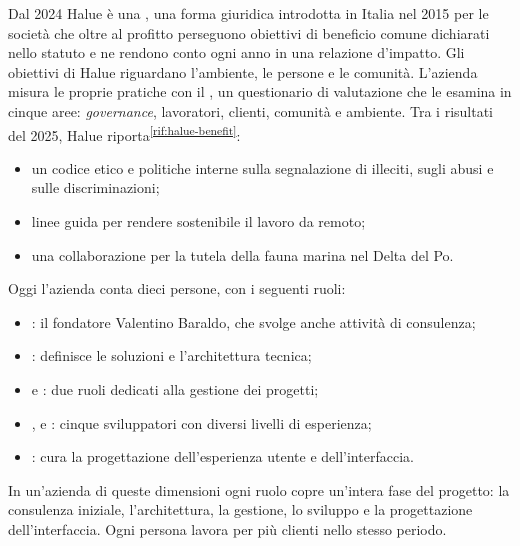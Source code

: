 Dal 2024 Halue è una , una forma giuridica introdotta in
Italia nel 2015 per le società che oltre al profitto perseguono obiettivi di beneficio comune
dichiarati nello statuto e ne rendono conto ogni anno in una relazione d’impatto. Gli obiettivi di
Halue riguardano l’ambiente, le persone e le comunità. L’azienda misura le proprie pratiche con il
, un questionario di valutazione che le
esamina in cinque aree: \emph{governance}, lavoratori, clienti, comunità e ambiente. Tra i
risultati del 2025, Halue riporta\textsuperscript{\ref{rif:halue-benefit}}:

\begin{itemize}
	\item un codice etico e politiche interne sulla segnalazione di illeciti, sugli abusi e sulle
	discriminazioni;
	\item linee guida per rendere sostenibile il lavoro da remoto;
	\item una collaborazione per la tutela della fauna marina nel Delta del Po.
\end{itemize}

Oggi l’azienda conta dieci persone, con i seguenti ruoli:

\begin{itemize}
        \item {}: il fondatore
	Valentino Baraldo, che svolge anche attività di consulenza;
        \item {}:
	definisce le soluzioni e l’architettura tecnica;
        \item {} e
	: due ruoli dedicati alla
	gestione dei progetti;
        \item {},
	 e : cinque sviluppatori con diversi livelli di esperienza;
        \item {}: cura la
	progettazione dell’esperienza utente e dell’interfaccia.
\end{itemize}

In un’azienda di queste dimensioni ogni ruolo copre un’intera fase del progetto: la consulenza
iniziale, l’architettura, la gestione, lo sviluppo e la progettazione dell’interfaccia. Ogni
persona lavora per più clienti nello stesso periodo.

